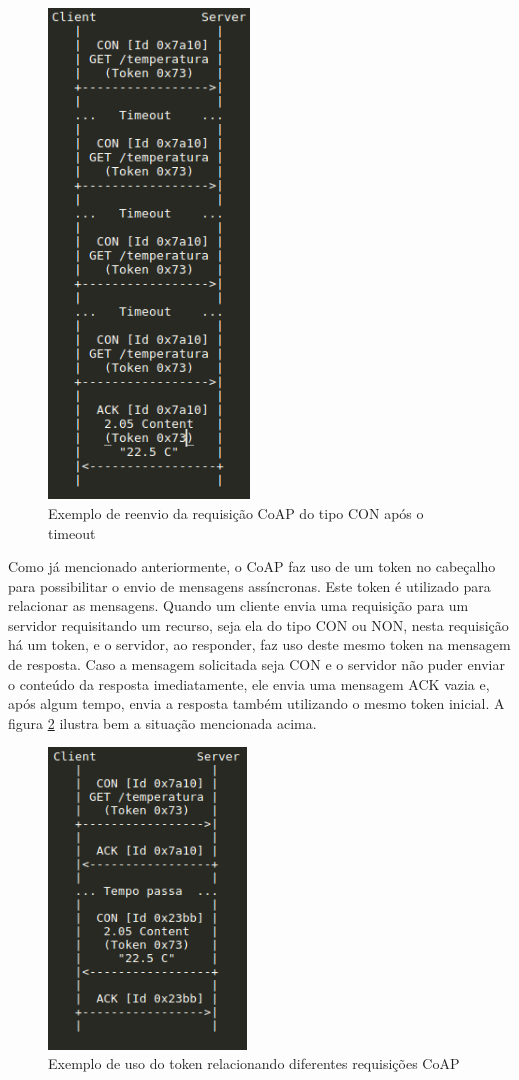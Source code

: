\begin{figure}[h]
\centering
\includegraphics[height=13cm]{figuras/coap_request_timeout.png}
\caption{Exemplo de reenvio da requisição CoAP do tipo CON após o timeout}
\label{fig:coap_timeout}
\end{figure}

Como já mencionado anteriormente, o CoAP faz uso de um token no cabeçalho para possibilitar o envio de mensagens assíncronas. Este token é utilizado para relacionar as mensagens. Quando um cliente envia uma requisição para um servidor requisitando um recurso, seja ela do tipo CON ou NON, nesta requisição há um token, e o servidor, ao responder, faz uso deste mesmo token na mensagem de resposta. Caso a mensagem solicitada seja CON e o servidor não puder enviar o conteúdo da resposta imediatamente, ele envia uma mensagem ACK vazia e, após algum tempo, envia a resposta também utilizando o mesmo token inicial. A figura \ref{fig:coap_token} ilustra bem a situação mencionada acima.

\begin{figure}[h]
\centering
\includegraphics[height=8cm]{figuras/coap_request_token.png}
\caption{Exemplo de uso do token relacionando diferentes requisições CoAP}
\label{fig:coap_token}
\end{figure}

